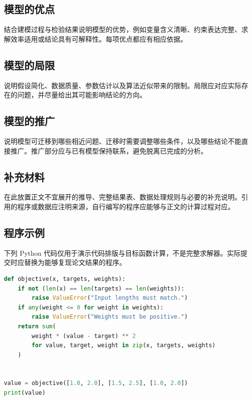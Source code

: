 \documentclass{gmcmthesis}
\begin{document}
\subsection{模型的优点}
结合建模过程与检验结果说明模型的优势，例如变量含义清晰、约束表达完整、求解效率适用或结论具有可解释性。每项优点都应有相应依据。

\subsection{模型的局限}
说明假设简化、数据质量、参数估计以及算法近似带来的限制。局限应对应实际存在的问题，并尽量给出其可能影响结论的方向。

\subsection{模型的推广}
说明模型可迁移到哪些相近问题、迁移时需要调整哪些条件，以及哪些结论不能直接推广。推广部分应与已有模型保持联系，避免脱离已完成的分析。




\appendix

\subsection{补充材料}
在此放置正文不宜展开的推导、完整结果表、数据处理规则与必要的补充说明。引用的程序或数据应注明来源，自行编写的程序应能够与正文的计算过程对应。

\subsection{程序示例}
下列 Python 代码仅用于演示代码排版与目标函数计算，不是完整求解器。实际提交时应替换为能够复现论文结果的程序。

\begin{lstlisting}[language=Python]
def objective(x, targets, weights):
    if not (len(x) == len(targets) == len(weights)):
        raise ValueError("Input lengths must match.")
    if any(weight <= 0 for weight in weights):
        raise ValueError("Weights must be positive.")
    return sum(
        weight * (value - target) ** 2
        for value, target, weight in zip(x, targets, weights)
    )


value = objective([1.0, 2.0], [1.5, 2.5], [1.0, 2.0])
print(value)
\end{lstlisting}
\end{document}
